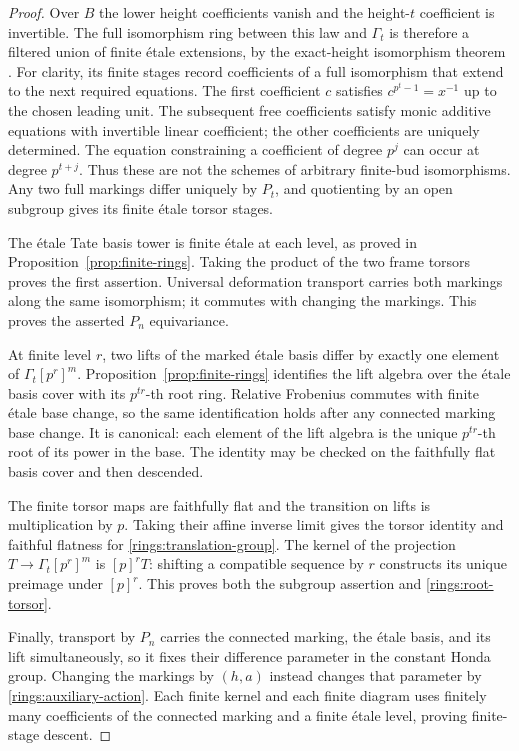 \begin{proof}
Over $B$ the lower height coefficients vanish and the
height-$t$ coefficient is invertible.  The full isomorphism
ring between this law and $\Gamma_t$ is therefore a filtered
union of finite \'etale extensions, by the exact-height
isomorphism theorem \cite[Lecture~14, Theorem~1]{LurieFormalGroups}.
For clarity, its finite stages record coefficients of a full
isomorphism that extend to the next required equations.
The first coefficient $c$ satisfies
$c^{p^t-1}=x^{-1}$ up to the chosen leading unit.  The
subsequent free coefficients satisfy monic additive equations
with invertible linear coefficient; the other coefficients
are uniquely determined.  The equation constraining a
coefficient of degree $p^j$ can occur at degree $p^{t+j}$.
Thus these are not the schemes of arbitrary finite-bud
isomorphisms.  Any two full markings differ uniquely by
$P_t$, and quotienting by an open subgroup gives its finite
\'etale torsor stages.

The \'etale Tate basis tower is finite \'etale at each
level, as proved in Proposition~\ref{prop:finite-rings}.
Taking the product of the two frame torsors proves the
first assertion.  Universal deformation transport carries
both markings along the same isomorphism; it commutes with
changing the markings.  This proves the asserted $P_n$
equivariance.

At finite level $r$, two lifts of the marked \'etale basis
differ by exactly one element of $\Gamma_t[p^r]^m$.
Proposition~\ref{prop:finite-rings} identifies the lift
algebra over the \'etale basis cover with its $p^{tr}$-th
root ring.  Relative Frobenius commutes with finite \'etale
base change, so the same identification holds after any
connected marking base change.  It is canonical: each
element of the lift algebra is the unique $p^{tr}$-th root
of its power in the base.  The identity may be checked on
the faithfully flat basis cover and then descended.

The finite torsor maps are faithfully flat and the
transition on lifts is multiplication by $p$.  Taking
their affine inverse limit gives the torsor identity and
faithful flatness for \eqref{rings:translation-group}.
The kernel of the projection $T\to\Gamma_t[p^r]^m$ is
$[p]^rT$: shifting a compatible sequence by $r$ constructs
its unique preimage under $[p]^r$.  This proves both the
subgroup assertion and \eqref{rings:root-torsor}.

Finally, transport by $P_n$ carries the connected marking,
the \'etale basis, and its lift simultaneously, so it fixes
their difference parameter in the constant Honda group.
Changing the markings by $(h,a)$ instead changes that
parameter by \eqref{rings:auxiliary-action}.  Each finite
kernel and each finite diagram uses finitely many
coefficients of the connected marking and a finite
\'etale level, proving finite-stage descent.
\end{proof}

